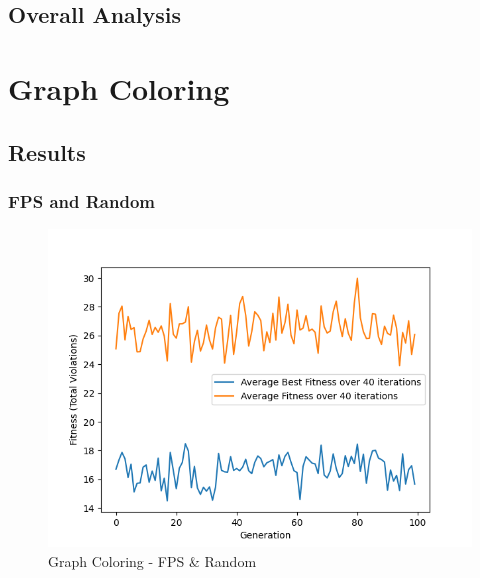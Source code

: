 \documentclass[11pt, letterpaper]{article}
\begin{document}
\subsection {Overall Analysis}

\newpage

\section{Graph Coloring}
\subsection {Results} 
\subsubsection {FPS and Random}
\begin{figure}[H]
    \centering
    \includegraphics[scale = 0.6]{images/graphcoloring_fp_rd.png}
    \caption {Graph Coloring - FPS \& Random}
    \label {fig:gcFR}
\end{figure}
\end{document}
